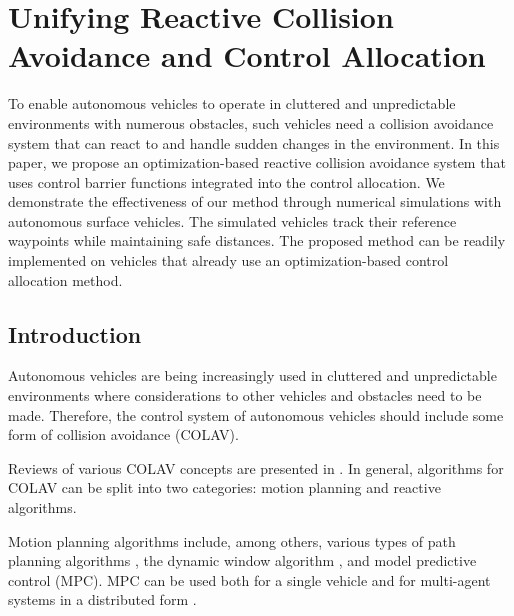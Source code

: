 \chapter{Unifying Reactive Collision Avoidance and Control Allocation}
\label{chap:collision_avoidance}

To enable autonomous vehicles to operate in cluttered and unpredictable environments with numerous obstacles, such vehicles need a collision avoidance system that can react to and handle sudden changes in the environment.
In this paper, we propose an optimization-based reactive collision avoidance system that uses control barrier functions integrated into the control allocation.
We demonstrate the effectiveness of our method through numerical simulations with autonomous surface vehicles. The simulated vehicles track their reference waypoints while maintaining safe distances.
The proposed method can be readily implemented on vehicles that already use an optimization-based control allocation method.

\section{Introduction}
Autonomous vehicles are being increasingly used in cluttered and unpredictable environments where considerations to other vehicles and obstacles need to be made. 
Therefore, the control system of autonomous vehicles should include some form of collision avoidance (COLAV).

Reviews of various COLAV concepts are presented in \cite{statheros_autonomous_2008,tam_review_2009,hoy_algorithms_2015}.
In general, algorithms for COLAV can be split into two categories: motion planning and reactive algorithms.

Motion planning algorithms include, among others, various types of path planning algorithms \cite{wang_ship_2017,kuwata_safe_2014,lazarowska_ships_2015}, the dynamic window algorithm \cite{fox_dynamic_1997}, and model predictive control (MPC).
MPC can be used both for a single vehicle \cite{hagen_mpc-based_2018,sun_collision_2018} and for multi-agent systems in a distributed form \cite{kuriki_formation_2015,dai_distributed_2017}.

